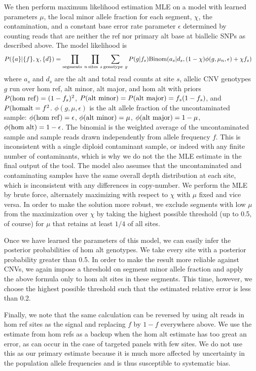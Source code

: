 \documentclass[nofootinbib,amssymb,amsmath]{revtex4}
\begin{document}
We then perform maximum likelihood estimation MLE on a model with learned parameters $\mu$, the local minor allele fraction for each segment, $\chi$, the contamination, and a constant base error rate parameter $\epsilon$ determined by counting reads that are neither the ref nor primary alt base at biallelic SNPs as described above.  The model likelihood is
\begin{equation}
P(\{ a\}| \{f\}, \chi, \{d\}) =    \prod_{{\rm segments~}n}\prod_{{\rm sites~}s} \sum_{{\rm genotype~}g} P(g|f_s) {\rm Binom}(a_s | d_s, (1 - \chi) \phi(g, \mu_n, \epsilon) + \chi f_s)
\end{equation}
where $a_s$ and $d_s$ are the alt and total read counts at site $s$, allelic CNV genotypes $g$ run over hom ref, alt minor, alt major, and hom alt with priors $P({\rm hom~ref}) = (1-f_s)^2$, $P({\rm alt~minor}) = P({\rm alt~major}) = f_s(1-f_s)$, and $P({\rm hom alt} = f^2$.  $\phi(g, \mu, \epsilon)$ is the alt allele fraction of the uncontaminated sample: $\phi({\rm hom~ref}) = \epsilon$, $\phi({\rm alt~minor}) = \mu$, $\phi({\rm alt~major}) = 1 - \mu$, $\phi({\rm hom~alt}) = 1 - \epsilon$.  The binomial is the weighted average of the uncontaminated sample and sample reads drawn independently from allele frequency $f$.  This is inconsistent with a single diploid contaminant sample, or indeed with any finite number of contaminants, which is why we do not the the MLE estimate in the final output of the tool.  The model also assumes that the uncontaminated and contaminating samples have the same overall depth distribution at each site, which is inconsistent with any differences in copy-number.  We perform the MLE by brute force, alternately maximizing with respect to $\chi$ with $\mu$ fixed and vice versa.  In order to make the solution more robust, we exclude segments with low $\mu$ from the maximization over $\chi$ by taking the highest possible threshold (up to 0.5, of course) for $\mu$ that retains at least $1/4$ of all sites.

Once we have learned the parameters of this model, we can easily infer the posterior probabilities of hom alt genotypes.  We take every site with a posterior probability greater than 0.5.  In order to make the result more reliable against CNVs, we again impose a threshold on segment minor allele fraction and apply the above formula only to hom alt sites in these segments.  This time, however, we choose the highest possible threshold such that the estimated relative error is less than 0.2.

Finally, we note that the same calculation can be reversed by using alt reads in hom ref sites as the signal and replacing $f$ by $1-f$ everywhere above.  We use the estimate from hom refs as a backup when the hom alt estimate has too great an error, as can occur in the case of targeted panels with few sites.  We do not use this as our primary estimate because it is much more affected by uncertainty in the population allele frequencies and is thus susceptible to systematic bias.
\end{document}
